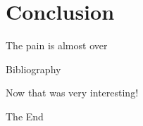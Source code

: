 \documentclass[10pt]{beamer}
\begin{document}
\section{Conclusion}
\begin{frame}{The pain is almost over}
\end{frame}
\begin{frame}{Bibliography}
\end{frame}
\endgroup

\begingroup
{}
\begin{frame}[plain,c]
\hspace*{10 mm}
\vspace*{-18 mm}
\textcolor{blue_light}{\Large{Now that was very interesting!}}
\end{frame}
\begin{frame}[plain,c]
\hspace*{30 mm}
\vspace*{-20 mm}
\textcolor{blue_light}{\Large{The End}}
\end{frame}
\endgroup
\end{document}
